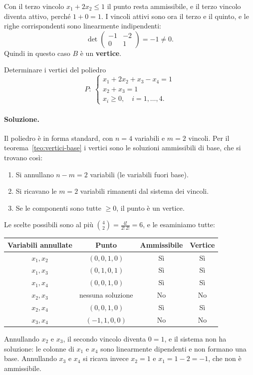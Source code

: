 Con il terzo vincolo $x_1 + 2x_2 \le 1$ il punto resta ammissibile, e il terzo vincolo diventa attivo, perché $1 + 0 = 1$. I vincoli attivi sono ora il terzo e il quinto, e le righe corrispondenti sono linearmente indipendenti:
\[
\det \begin{pmatrix} -1 & -2 \\ 0 & 1 \end{pmatrix} = -1 \neq 0.
\]
Quindi in questo caso $B$ è un \textbf{vertice}.

\begin{esercizio}
Determinare i vertici del poliedro
\[
P:\ \begin{cases}
x_1 + 2x_2 + x_3 - x_4 = 1 \\
x_2 + x_3 = 1 \\
x_i \ge 0, \quad i = 1, \dots, 4.
\end{cases}
\]
\end{esercizio}

\paragraph{Soluzione.}
Il poliedro è in forma standard, con $n = 4$ variabili e $m = 2$ vincoli. Per il teorema~\ref{teo:vertici-base} i vertici sono le soluzioni ammissibili di base, che si trovano così:
\begin{enumerate}
    \item Si annullano $n - m = 2$ variabili (le variabili fuori base).
    \item Si ricavano le $m = 2$ variabili rimanenti dal sistema dei vincoli.
    \item Se le componenti sono tutte $\ge 0$, il punto è un vertice.
\end{enumerate}
Le scelte possibili sono al più $\binom{4}{2} = \frac{4!}{2!\,2!} = 6$, e le esaminiamo tutte:
\begin{center}
\begin{tabular}{cccc}
\toprule
Variabili annullate & Punto & Ammissibile & Vertice \\
\midrule
$x_1, x_2$ & $(0, 0, 1, 0)$ & Sì & Sì \\
$x_1, x_3$ & $(0, 1, 0, 1)$ & Sì & Sì \\
$x_1, x_4$ & $(0, 0, 1, 0)$ & Sì & Sì \\
$x_2, x_3$ & nessuna soluzione & No & No \\
$x_2, x_4$ & $(0, 0, 1, 0)$ & Sì & Sì \\
$x_3, x_4$ & $(-1, 1, 0, 0)$ & No & No \\
\bottomrule
\end{tabular}
\end{center}
Annullando $x_2$ e $x_3$, il secondo vincolo diventa $0 = 1$, e il sistema non ha soluzione: le colonne di $x_1$ e $x_4$ sono linearmente dipendenti e non formano una base. Annullando $x_3$ e $x_4$ si ricava invece $x_2 = 1$ e $x_1 = 1 - 2 = -1$, che non è ammissibile.

